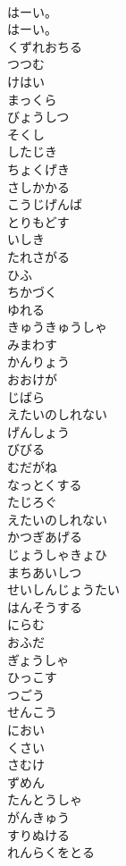 \documentclass[8pt]{extreport}
\begin{document}
\begin{CJK}{UTF8}{min}
\\	はーい。
\\	はーい。
\\	くずれおちる
\\	つつむ
\\	けはい
\\	まっくら
\\	びょうしつ
\\	そくし
\\	したじき
\\	ちょくげき
\\	さしかかる
\\	こうじげんば
\\	とりもどす
\\	いしき
\\	たれさがる
\\	ひふ
\\	ちかづく
\\	ゆれる
\\	きゅうきゅうしゃ
\\	みまわす
\\	かんりょう
\\	おおけが
\\	じばら
\\	えたいのしれない
\\	げんしょう
\\	びびる
\\	むだがね
\\	なっとくする
\\	たじろぐ
\\	えたいのしれない
\\	かつぎあげる
\\	じょうしゃきょひ
\\	まちあいしつ
\\	せいしんじょうたい
\\	はんそうする
\\	にらむ
\\	おふだ
\\	ぎょうしゃ
\\	ひっこす
\\	つごう
\\	せんこう
\\	におい
\\	くさい
\\	さむけ
\\	ずめん
\\	たんとうしゃ
\\	がんきゅう
\\	すりぬける
\\	れんらくをとる

\end{CJK}
\end{document}
